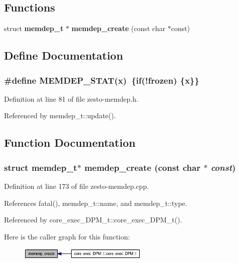 \subsection*{Functions}
\begin{CompactItemize}
\item 
struct {\bf memdep\_\-t} $\ast$ {\bf memdep\_\-create} (const char $\ast$const)
\end{CompactItemize}


\subsection{Define Documentation}
\subsubsection[{MEMDEP\_\-STAT}]{\setlength{\rightskip}{0pt plus 5cm}\#define MEMDEP\_\-STAT(x)~\{if(!frozen) \{x\}\}}\label{zesto-memdep_8h_daa4203d312c382c8fa91f34a68666ff}




Definition at line 81 of file zesto-memdep.h.

Referenced by memdep\_\-t::update().

\subsection{Function Documentation}
\subsubsection[{memdep\_\-create}]{\setlength{\rightskip}{0pt plus 5cm}struct {\bf memdep\_\-t}$\ast$ memdep\_\-create (const char $\ast$ {\em const})\hspace{0.3cm}{\tt  [read]}}\label{zesto-memdep_8h_a57de6ca6027a4699990d07a84f6b06e}




Definition at line 173 of file zesto-memdep.cpp.

References fatal(), memdep\_\-t::name, and memdep\_\-t::type.

Referenced by core\_\-exec\_\-DPM\_\-t::core\_\-exec\_\-DPM\_\-t().

Here is the caller graph for this function:\nopagebreak
\begin{figure}[H]
\begin{center}
\leavevmode
\includegraphics[width=175pt]{zesto-memdep_8h_a57de6ca6027a4699990d07a84f6b06e_icgraph}
\end{center}
\end{figure}
